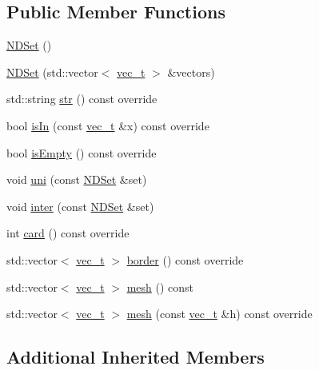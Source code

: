 \subsection*{Public Member Functions}
\begin{DoxyCompactItemize}
\item 
\mbox{\hyperlink{class_n_d_set_a906983146babefe3d4824d282887c083}{N\+D\+Set}} ()
\item 
\mbox{\hyperlink{class_n_d_set_a2f01f90688a50dffc1b1b19ab3e34a7f}{N\+D\+Set}} (std\+::vector$<$ \mbox{\hyperlink{group___n_algebra_ga0a2cfc67e738a3d73e4f12098c4c07f6}{vec\+\_\+t}} $>$ \&vectors)
\item 
std\+::string \mbox{\hyperlink{class_n_d_set_ada343b5d74ced1894dfe098c6324d61e}{str}} () const override
\item 
bool \mbox{\hyperlink{class_n_d_set_a0023b3999000c4d5ed05704d7346466d}{is\+In}} (const \mbox{\hyperlink{group___n_algebra_ga0a2cfc67e738a3d73e4f12098c4c07f6}{vec\+\_\+t}} \&x) const override
\item 
bool \mbox{\hyperlink{class_n_d_set_aafdebcaf09b5efa04872041e4449190c}{is\+Empty}} () const override
\item 
void \mbox{\hyperlink{class_n_d_set_ae32071d88d0a669e3e397ec20ef16cd5}{uni}} (const \mbox{\hyperlink{class_n_d_set}{N\+D\+Set}} \&set)
\item 
void \mbox{\hyperlink{class_n_d_set_abf13bbb9169af9e4b507fc8fcfb83232}{inter}} (const \mbox{\hyperlink{class_n_d_set}{N\+D\+Set}} \&set)
\item 
int \mbox{\hyperlink{class_n_d_set_a683386499ad6a9de65e0197f2846d8de}{card}} () const override
\item 
std\+::vector$<$ \mbox{\hyperlink{group___n_algebra_ga0a2cfc67e738a3d73e4f12098c4c07f6}{vec\+\_\+t}} $>$ \mbox{\hyperlink{class_n_d_set_a3020476b78835439f6474845d30f00ff}{border}} () const override
\item 
std\+::vector$<$ \mbox{\hyperlink{group___n_algebra_ga0a2cfc67e738a3d73e4f12098c4c07f6}{vec\+\_\+t}} $>$ \mbox{\hyperlink{class_n_d_set_a18273bfd133548e2012d1c8bd7cf566c}{mesh}} () const
\item 
std\+::vector$<$ \mbox{\hyperlink{group___n_algebra_ga0a2cfc67e738a3d73e4f12098c4c07f6}{vec\+\_\+t}} $>$ \mbox{\hyperlink{class_n_d_set_ae57fe6ad1422876fa4256a28c3a26a13}{mesh}} (const \mbox{\hyperlink{group___n_algebra_ga0a2cfc67e738a3d73e4f12098c4c07f6}{vec\+\_\+t}} \&h) const override
\end{DoxyCompactItemize}
\subsection*{Additional Inherited Members}


